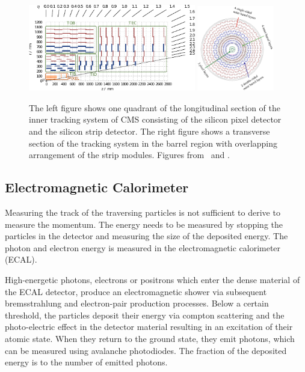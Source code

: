 \begin{figure}[htp]
    \centering
    \includegraphics[width=0.65\textwidth]{figures/cms_detector/tracker.pdf}\hfill
    \includegraphics[width=0.3\textwidth]{figures/cms_detector/tracking_sytem_barrel_slice.png}
    \caption[Inner Tracking System]{The left figure shows one quadrant of the
        longitudinal section of the inner tracking system of CMS consisting of the
        silicon pixel detector and the silicon strip detector. The right figure shows a
        transverse section of the tracking system in the barrel region with overlapping
        arrangement of the strip modules. Figures from~\cite{Berger:2014aca} and
        \cite{cmsweb:innertracker}.}
    \label{fig:cms:inner_tracking}
\end{figure}

\subsection{Electromagnetic Calorimeter}

Measuring the track of the traversing particles is not sufficient to derive to
measure the momentum. The energy needs to be measured by stopping the particles
in the detector and measuring the size of the deposited energy. The photon and
electron energy is measured in the electromagnetic calorimeter (ECAL). 

High-energetic photons, electrons or positrons which enter the dense material of the ECAL
detector, produce an electromagnetic shower via subsequent bremsstrahlung and
electron-pair production processes. Below a certain threshold, the particles
deposit their energy via compton scattering and the photo-electric effect in the
detector material resulting in an excitation of their atomic state. When they
return to the ground state, they emit photons, which can be measured using
avalanche photodiodes. The fraction of the deposited energy is to the number of
emitted photons.

